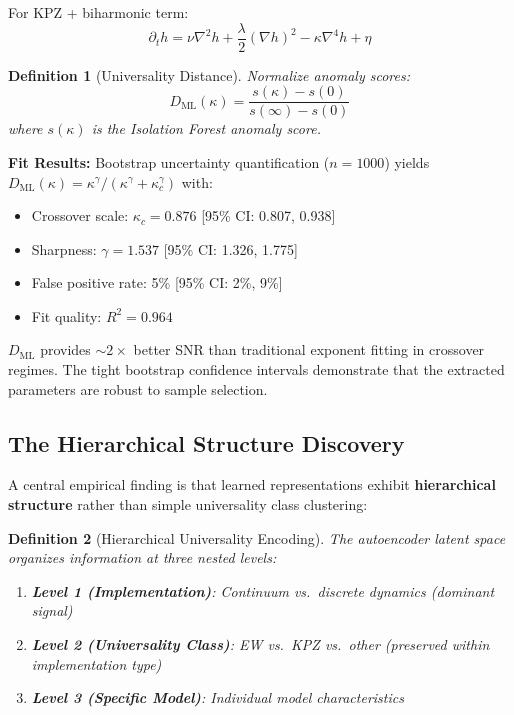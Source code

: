 \documentclass[aps,pre,reprint,amsmath,amssymb,superscriptaddress]{revtex4-2}
\newtheorem{definition}{Definition}
\begin{document}
For KPZ + biharmonic term:
\begin{equation}
\partial_t h = \nu\nabla^2 h + \frac{\lambda}{2}(\nabla h)^2 - \kappa\nabla^4 h + \eta
\end{equation}

\begin{definition}[Universality Distance]
Normalize anomaly scores:
\begin{equation}
D_{\text{ML}}(\kappa) = \frac{s(\kappa) - s(0)}{s(\infty) - s(0)}
\end{equation}
where $s(\kappa)$ is the Isolation Forest anomaly score.
\end{definition}

\textbf{Fit Results:} Bootstrap uncertainty quantification ($n=1000$) yields $D_{\text{ML}}(\kappa) = \kappa^\gamma/(\kappa^\gamma + \kappa_c^\gamma)$ with:
\begin{itemize}
\item Crossover scale: $\kappa_c = 0.876$ [95\% CI: 0.807, 0.938]
\item Sharpness: $\gamma = 1.537$ [95\% CI: 1.326, 1.775]
\item False positive rate: 5\% [95\% CI: 2\%, 9\%]
\item Fit quality: $R^2 = 0.964$
\end{itemize}

$D_{\text{ML}}$ provides $\sim 2\times$ better SNR than traditional exponent fitting in crossover regimes. The tight bootstrap confidence intervals demonstrate that the extracted parameters are robust to sample selection.

\subsection{The Hierarchical Structure Discovery}
\label{sec:hierarchy}

A central empirical finding is that learned representations exhibit \textbf{hierarchical structure} rather than simple universality class clustering:

\begin{definition}[Hierarchical Universality Encoding]
The autoencoder latent space organizes information at three nested levels:
\begin{enumerate}
\item \textbf{Level 1 (Implementation)}: Continuum vs.~discrete dynamics (dominant signal)
\item \textbf{Level 2 (Universality Class)}: EW vs.~KPZ vs.~other (preserved within implementation type)
\item \textbf{Level 3 (Specific Model)}: Individual model characteristics
\end{enumerate}
\end{definition}
\end{document}
